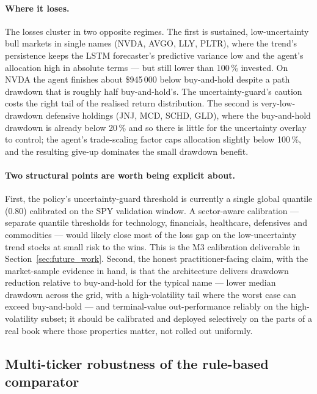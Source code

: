 \paragraph{Where it loses.} The losses cluster in two opposite regimes. The first is sustained, low-uncertainty bull markets in single names (NVDA, AVGO, LLY, PLTR), where the trend's persistence keeps the LSTM forecaster's predictive variance low and the agent's allocation high in absolute terms --- but still lower than 100\,\% invested. On NVDA the agent finishes about \$945\,000 below buy-and-hold despite a path drawdown that is roughly half buy-and-hold's. The uncertainty-guard's caution costs the right tail of the realised return distribution. The second is very-low-drawdown defensive holdings (JNJ, MCD, SCHD, GLD), where the buy-and-hold drawdown is already below 20\,\% and so there is little for the uncertainty overlay to control; the agent's trade-scaling factor caps allocation slightly below 100\,\%, and the resulting give-up dominates the small drawdown benefit.

\paragraph{Two structural points are worth being explicit about.} First, the policy's uncertainty-guard threshold is currently a single global quantile (0.80) calibrated on the SPY validation window. A sector-aware calibration --- separate quantile thresholds for technology, financials, healthcare, defensives and commodities --- would likely close most of the loss gap on the low-uncertainty trend stocks at small risk to the wins. This is the M3 calibration deliverable in Section~\ref{sec:future_work}. Second, the honest practitioner-facing claim, with the market-sample evidence in hand, is that the architecture delivers drawdown reduction relative to buy-and-hold for the typical name --- lower median drawdown across the grid, with a high-volatility tail where the worst case can exceed buy-and-hold --- and terminal-value out-performance reliably on the high-volatility subset; it should be calibrated and deployed selectively on the parts of a real book where those properties matter, not rolled out uniformly.

\subsection{Multi-ticker robustness of the rule-based comparator}
\label{sec:rule_based_robustness}

